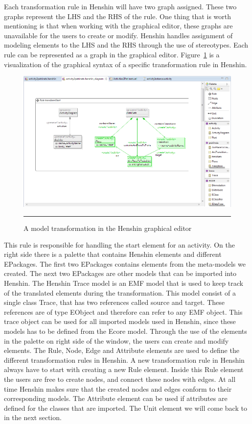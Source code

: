 Each transformation rule in Henshin will have two graph assigned.
These two graphs represent the LHS and the RHS of the rule. One thing that is worth mentioning is
that when working with the graphical editor, these graphs are unavailable for
the users to create or modify. Henshin handles assignment of modeling elements
to the LHS and the RHS through the use of stereotypes. Each rule can be
represented as a graph in the graphical editor. Figure~\ref{fig:HenshinScreen}
is a visualization of the graphical syntax of a specific transformation rule in
Henshin.

\begin{figure}[H]
	\centering
	\includegraphics[scale=0.5]{figures/Henshin_Screen.png}
	\rule{35em}{0.5pt}
	\caption[The Henshin graphical editor]
	{A model transformation in the Henshin graphical editor}
	\label{fig:HenshinScreen}
\end{figure}

This rule is responsible for handling the start element for an activity.
On the right side there is a palette that contains Henshin elements and
different EPackages. The first two EPackages contains elements from the
meta-models we created. The next two EPackages are other models that can
be imported into Henshin. The Henshin Trace model is an EMF model that is used
to keep track of the translated elements during the transformation. This model
consist of a single class Trace, that has two references called source and
target. These references are of type EObject and therefore can refer to any EMF
object. This trace object can be used for all imported models used
in Henshin, since these models has to be defined from the Ecore model. Through
the use of the elements in the palette on right side of the window, the users
can create and modify elements. 
The Rule, Node, Edge and Attribute elements are used to define the different
transformation rules in Henshin. A new transformation rule in Henshin always
have to start with creating a new Rule element. Inside this Rule element the
users are free to create nodes, and connect these nodes with edges. At
all time Henshin makes sure that the created nodes and edges conform to their
corresponding models. The Attribute element can be used if attributes are
defined for the classes that are imported. The Unit element we will come back to
in the next section.

